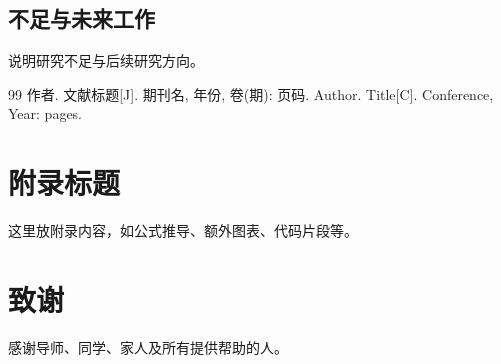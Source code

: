 \documentclass[12pt,a4paper]{ctexrep}
\begin{document}
\section{不足与未来工作}
说明研究不足与后续研究方向。

\begin{thebibliography}{99}
 作者. 文献标题[J]. 期刊名, 年份, 卷(期): 页码.
 Author. Title[C]. Conference, Year: pages.
\end{thebibliography}

\appendix
\chapter{附录标题}
这里放附录内容，如公式推导、额外图表、代码片段等。

\chapter*{致谢}
感谢导师、同学、家人及所有提供帮助的人。
\end{document}
